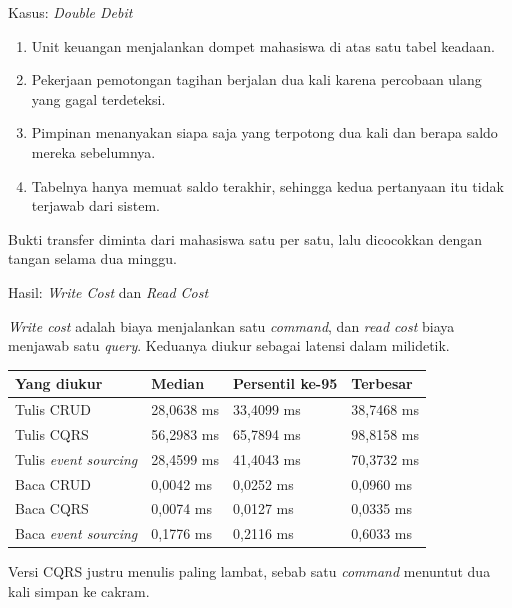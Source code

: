 \documentclass[aspectratio=169, table, 12pt]{beamer}
\begin{document}
\begin{frame}{{\Large Kasus: \textit{Double Debit}}}
  \vspace{8pt}
  \begin{enumerate}\small
    \item Unit keuangan menjalankan dompet mahasiswa di atas satu tabel
          keadaan.
    \item Pekerjaan pemotongan tagihan berjalan dua kali karena percobaan ulang
          yang gagal terdeteksi.
    \item Pimpinan menanyakan siapa saja yang terpotong dua kali dan berapa
          saldo mereka sebelumnya.
    \item Tabelnya hanya memuat saldo terakhir, sehingga kedua pertanyaan itu
          tidak terjawab dari sistem.
  \end{enumerate}

  \vspace{8pt}
  {\small Bukti transfer diminta dari mahasiswa satu per satu, lalu dicocokkan
  dengan tangan selama dua minggu.}
\end{frame}

\begin{frame}{{\Large Hasil: \textit{Write Cost} dan \textit{Read Cost}}}
  \vspace{4pt}
  \raggedright
  {\small \textit{Write cost} adalah biaya menjalankan satu \textit{command},
  dan \textit{read cost} biaya menjawab satu \textit{query}. Keduanya diukur
  sebagai latensi dalam milidetik.}

  \vspace{4pt}
  \centering
  \small
  \begin{tabularx}{0.92\textwidth}{|X|l|l|l|}
    \hline
    \textbf{Yang diukur} & \textbf{Median} & \textbf{Persentil ke-95} & \textbf{Terbesar} \\
    \hline
    Tulis CRUD & 28,0638 ms & 33,4099 ms & 38,7468 ms \\
    \hline
    Tulis CQRS & 56,2983 ms & 65,7894 ms & 98,8158 ms \\
    \hline
    Tulis \textit{event sourcing} & 28,4599 ms & 41,4043 ms & 70,3732 ms \\
    \hline
    Baca CRUD & 0,0042 ms & 0,0252 ms & 0,0960 ms \\
    \hline
    Baca CQRS & 0,0074 ms & 0,0127 ms & 0,0335 ms \\
    \hline
    Baca \textit{event sourcing} & 0,1776 ms & 0,2116 ms & 0,6033 ms \\
    \hline
  \end{tabularx}

  \vspace{6pt}
  {\small Versi CQRS justru menulis paling lambat, sebab satu \textit{command} menuntut
  dua kali simpan ke cakram.}
\end{frame}
\end{document}
